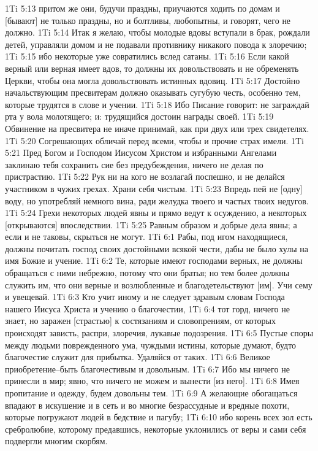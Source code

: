 1Ti 5:13  притом же они, будучи праздны, приучаются ходить по домам и [бывают] не только праздны, но и болтливы, любопытны, и говорят, чего не должно.
1Ti 5:14  Итак я желаю, чтобы молодые вдовы вступали в брак, рождали детей, управляли домом и не подавали противнику никакого повода к злоречию;
1Ti 5:15  ибо некоторые уже совратились вслед сатаны.
1Ti 5:16  Если какой верный или верная имеет вдов, то должны их довольствовать и не обременять Церкви, чтобы она могла довольствовать истинных вдовиц.
1Ti 5:17  Достойно начальствующим пресвитерам должно оказывать сугубую честь, особенно тем, которые трудятся в слове и учении.
1Ti 5:18  Ибо Писание говорит: не заграждай рта у вола молотящего; и: трудящийся достоин награды своей.
1Ti 5:19  Обвинение на пресвитера не иначе принимай, как при двух или трех свидетелях.
1Ti 5:20  Согрешающих обличай перед всеми, чтобы и прочие страх имели.
1Ti 5:21  Пред Богом и Господом Иисусом Христом и избранными Ангелами заклинаю тебя сохранить сие без предубеждения, ничего не делая по пристрастию.
1Ti 5:22  Рук ни на кого не возлагай поспешно, и не делайся участником в чужих грехах. Храни себя чистым.
1Ti 5:23  Впредь пей не [одну] воду, но употребляй немного вина, ради желудка твоего и частых твоих недугов.
1Ti 5:24  Грехи некоторых людей явны и прямо ведут к осуждению, а некоторых [открываются] впоследствии.
1Ti 5:25  Равным образом и добрые дела явны; а если и не таковы, скрыться не могут.
1Ti 6:1  Рабы, под игом находящиеся, должны почитать господ своих достойными всякой чести, дабы не было хулы на имя Божие и учение.
1Ti 6:2  Те, которые имеют господами верных, не должны обращаться с ними небрежно, потому что они братья; но тем более должны служить им, что они верные и возлюбленные и благодетельствуют [им]. Учи сему и увещевай.
1Ti 6:3  Кто учит иному и не следует здравым словам Господа нашего Иисуса Христа и учению о благочестии,
1Ti 6:4  тот горд, ничего не знает, но заражен [страстью] к состязаниям и словопрениям, от которых происходят зависть, распри, злоречия, лукавые подозрения.
1Ti 6:5  Пустые споры между людьми поврежденного ума, чуждыми истины, которые думают, будто благочестие служит для прибытка. Удаляйся от таких.
1Ti 6:6  Великое приобретение--быть благочестивым и довольным.
1Ti 6:7  Ибо мы ничего не принесли в мир; явно, что ничего не можем и вынести [из него].
1Ti 6:8  Имея пропитание и одежду, будем довольны тем.
1Ti 6:9  А желающие обогащаться впадают в искушение и в сеть и во многие безрассудные и вредные похоти, которые погружают людей в бедствие и пагубу;
1Ti 6:10  ибо корень всех зол есть сребролюбие, которому предавшись, некоторые уклонились от веры и сами себя подвергли многим скорбям.
